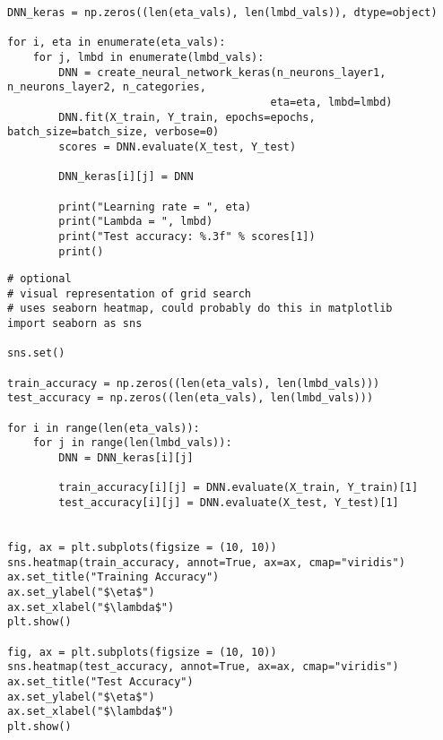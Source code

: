 \begin{verbatim}
DNN_keras = np.zeros((len(eta_vals), len(lmbd_vals)), dtype=object)
        
for i, eta in enumerate(eta_vals):
    for j, lmbd in enumerate(lmbd_vals):
        DNN = create_neural_network_keras(n_neurons_layer1, n_neurons_layer2, n_categories,
                                         eta=eta, lmbd=lmbd)
        DNN.fit(X_train, Y_train, epochs=epochs, batch_size=batch_size, verbose=0)
        scores = DNN.evaluate(X_test, Y_test)
        
        DNN_keras[i][j] = DNN
        
        print("Learning rate = ", eta)
        print("Lambda = ", lmbd)
        print("Test accuracy: %.3f" % scores[1])
        print()

\end{verbatim}


































\begin{verbatim}
# optional
# visual representation of grid search
# uses seaborn heatmap, could probably do this in matplotlib
import seaborn as sns

sns.set()

train_accuracy = np.zeros((len(eta_vals), len(lmbd_vals)))
test_accuracy = np.zeros((len(eta_vals), len(lmbd_vals)))

for i in range(len(eta_vals)):
    for j in range(len(lmbd_vals)):
        DNN = DNN_keras[i][j]

        train_accuracy[i][j] = DNN.evaluate(X_train, Y_train)[1]
        test_accuracy[i][j] = DNN.evaluate(X_test, Y_test)[1]

        
fig, ax = plt.subplots(figsize = (10, 10))
sns.heatmap(train_accuracy, annot=True, ax=ax, cmap="viridis")
ax.set_title("Training Accuracy")
ax.set_ylabel("$\eta$")
ax.set_xlabel("$\lambda$")
plt.show()

fig, ax = plt.subplots(figsize = (10, 10))
sns.heatmap(test_accuracy, annot=True, ax=ax, cmap="viridis")
ax.set_title("Test Accuracy")
ax.set_ylabel("$\eta$")
ax.set_xlabel("$\lambda$")
plt.show()

\end{verbatim}


